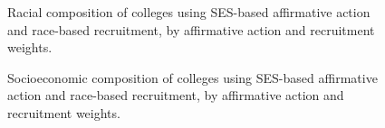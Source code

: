 \begin{figure}[p]
  \centering
  \hfill
  \caption{Racial composition of colleges using SES-based affirmative
    action and race-based recruitment, by affirmative action and
    recruitment weights.}
  \label{fig:A2}
\end{figure}

\begin{figure}[p]
  \centering
  \hfill
  \caption{Socioeconomic composition of colleges using SES-based
    affirmative action and race-based recruitment, by affirmative
    action and recruitment weights.}
  \label{fig:A3}
\end{figure}

